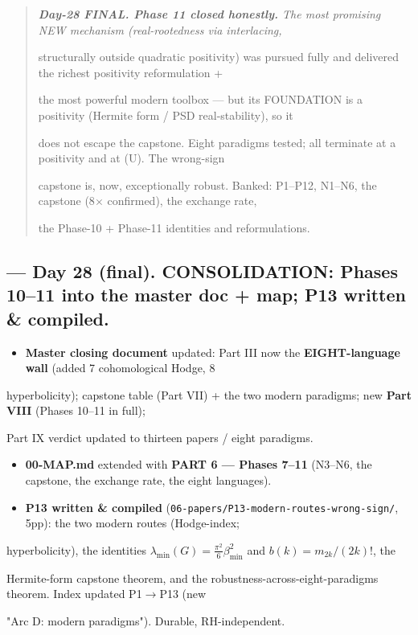 \documentclass[10pt]{article}
\begin{document}
\begin{quote}\itshape
\textbf{Day-28 FINAL. Phase 11 closed honestly.} The most promising NEW mechanism (real-rootedness via interlacing,\par
structurally outside quadratic positivity) was pursued fully and delivered the richest positivity reformulation +\par
the most powerful modern toolbox --- but its FOUNDATION is a positivity (Hermite form / PSD real-stability), so it\par
does not escape the capstone. Eight paradigms tested; all terminate at a positivity and at (U). The wrong-sign\par
capstone is, now, exceptionally robust. Banked: P1--P12, N1--N6, the capstone (8\ensuremath{\times} confirmed), the exchange rate,\par
the Phase-10 + Phase-11 identities and reformulations.\par
\end{quote}

\subsection*{ --- Day 28 (final). CONSOLIDATION: Phases 10--11 into the master doc + map; P13 written \& compiled.}
\begin{itemize}
\item \textbf{Master closing document} updated: Part III now the \textbf{EIGHT-language wall} (added 7 cohomological Hodge, 8
\end{itemize}
  hyperbolicity); capstone table (Part VII) + the two modern paradigms; new \textbf{Part VIII} (Phases 10--11 in full);\par
  Part IX verdict updated to thirteen papers / eight paradigms.\par
\begin{itemize}
\item \textbf{00-MAP.md} extended with \textbf{PART 6 --- Phases 7--11} (N3--N6, the capstone, the exchange rate, the eight languages).
\item \textbf{P13 written \& compiled} (\texttt{06-papers/P13-modern-routes-wrong-sign/}, 5pp): the two modern routes (Hodge-index;
\end{itemize}
  hyperbolicity), the identities $\lambda_{\min}(G)=\frac{\pi^2}6\beta_{\min}^2$ and $b(k)=m_{2k}/(2k)!$, the\par
  Hermite-form capstone theorem, and the robustness-across-eight-paradigms theorem. Index updated P1\ensuremath{\to}P13 (new\par
  "Arc D: modern paradigms"). Durable, RH-independent.\par
\end{document}
